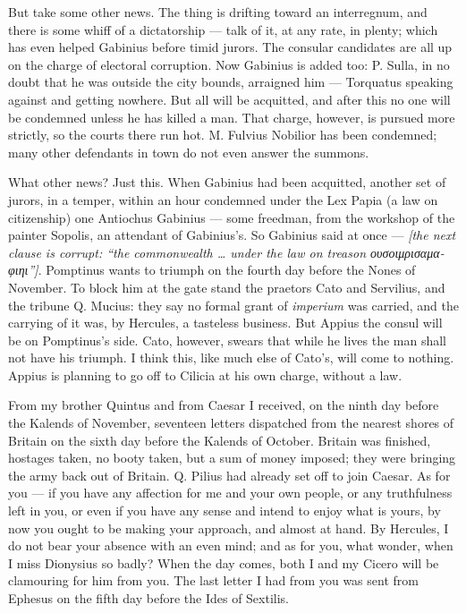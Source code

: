  But take some other news. The thing is drifting toward an interregnum, and there is some whiff of a dictatorship --- talk of it, at any rate, in plenty; which has even helped Gabinius before timid jurors. The consular candidates are all up on the charge of electoral corruption. Now Gabinius is added too: P. Sulla, in no doubt that he was outside the city bounds, arraigned him --- Torquatus speaking against and getting nowhere. But all will be acquitted, and after this no one will be condemned unless he has killed a man. That charge, however, is pursued more strictly, so the courts there run hot. M. Fulvius Nobilior has been condemned; many other defendants in town do not even answer the summons.

 What other news? Just this. When Gabinius had been acquitted, another set of jurors, in a temper, within an hour condemned under the Lex Papia (a law on citizenship) one Antiochus Gabinius --- some freedman, from the workshop of the painter Sopolis, an attendant of Gabinius's. So Gabinius said at once --- \textit{[the next clause is corrupt: ``the commonwealth \dots{} under the law on treason \textgreek{ουσοιμρισαμαφιηι}'']}. Pomptinus wants to triumph on the fourth day before the Nones of November. To block him at the gate stand the praetors Cato and Servilius, and the tribune Q. Mucius: they say no formal grant of \textit{imperium} was carried, and the carrying of it was, by Hercules, a tasteless business. But Appius the consul will be on Pomptinus's side. Cato, however, swears that while he lives the man shall not have his triumph. I think this, like much else of Cato's, will come to nothing. Appius is planning to go off to Cilicia at his own charge, without a law.

 From my brother Quintus and from Caesar I received, on the ninth day before the Kalends of November, seventeen letters dispatched from the nearest shores of Britain on the sixth day before the Kalends of October. Britain was finished, hostages taken, no booty taken, but a sum of money imposed; they were bringing the army back out of Britain. Q. Pilius had already set off to join Caesar. As for you --- if you have any affection for me and your own people, or any truthfulness left in you, or even if you have any sense and intend to enjoy what is yours, by now you ought to be making your approach, and almost at hand. By Hercules, I do not bear your absence with an even mind; and as for you, what wonder, when I miss Dionysius so badly? When the day comes, both I and my Cicero will be clamouring for him from you. The last letter I had from you was sent from Ephesus on the fifth day before the Ides of Sextilis.
